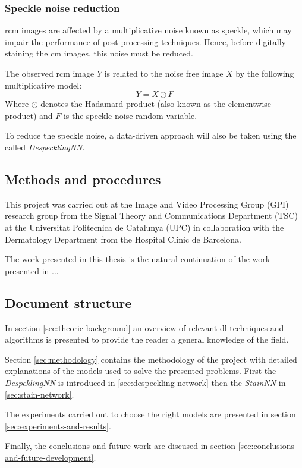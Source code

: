 \documentclass[../main.tex]{subfiles}
\begin{document}
% 
% 
% 

\subsubsection{Speckle noise reduction}
\gls{rcm} images are affected by a multiplicative noise known as speckle,
which may impair the performance of post-processing techniques.
Hence, before digitally staining the \gls{cm} images, this noise must be reduced.

The observed \gls{rcm} image $Y$ is related to the noise free image $X$ by
the following multiplicative model:
\begin{equation} \label{eq:speckle-model}
	Y = X \odot F
\end{equation}
Where $\odot$ denotes the Hadamard product (also known as the elementwise product)
and $F$ is the speckle noise random variable.

To reduce the speckle noise, a data-driven approach will also be taken using
the called \emph{DespecklingNN}.

\subsection{Methods and procedures}
\label{sec:methods-and-procedures}
This project was carried out at the Image and Video Processing Group (GPI) research
group from the Signal Theory and Communications Department (TSC) at the Universitat
Politecnica de Catalunya (UPC) in collaboration with the Dermatology Department from
the Hospital Clínic de Barcelona.

The work presented in this thesis is the natural continuation of the work presented
in \cite{Combalia2019}...

\subsection{Document structure}
In section \ref{sec:theoric-background} an overview of relevant \gls{dl} techniques and algorithms
is presented to provide the reader a general knowledge of the field.

Section \ref{sec:methodology} contains the methodology of the project with detailed
explanations of the models used to solve the presented problems. First the
\emph{DespeklingNN} is introduced in \ref{sec:despeckling-network} then the
\emph{StainNN} in \ref{sec:stain-network}.

The experiments carried out to choose the right models are presented in section
\ref{sec:experiments-and-results}.

Finally, the conclusions and future work are discused in section
\ref{sec:conclusions-and-future-development}.
\end{document}
